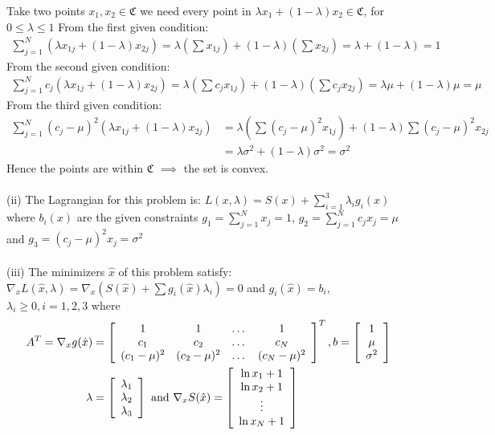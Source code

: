 \documentclass[12pt]{report}
\begin{document}
Take two points $x_1,x_2 \in \mathfrak{C}$ we need every point in $\lambda x_1 + (1-\lambda) x_2 \in \mathfrak{C}$, for 
$0\leq \lambda \leq 1 $
From the first given condition:
\begin{align*}
\sum_{j=1}^{N} \left( \lambda x_{1j} + (1- \lambda) x_{2j} \right) 
= \lambda(\sum x_{1j})+(1-\lambda)(\sum x_{2j}) = \lambda + (1-\lambda) = 1
\end{align*}
From the second given condition:
\begin{align*}
\sum_{j=1}^{N} c_j\left( \lambda x_{1j} + (1- \lambda) x_{2j} \right)
= \lambda(\sum c_j x_{1j} )+(1-\lambda)(\sum c_j x_{2j}) =  \lambda \mu + (1- \lambda) \mu = \mu
\end{align*}
From the third given condition:
\begin{align*}
\sum_{j=1}^{N} ( c_j-\mu )^2 ( \lambda x_{1j} + (1- \lambda) x_{2j} )
&=  \lambda \left( \sum( c_j-\mu )^2 x_{1j} \right) +(1- \lambda) \sum( c_j-\mu )^2x_{2j}\\
&= \lambda \sigma^2 + (1- \lambda) \sigma^2 = \sigma^2
\end{align*}
Hence the points are within $\mathfrak{C}$ $\implies$ the set is convex.\\
\\
(ii) The Lagrangian for this problem is: $L(x,\lambda)= S(x) + \sum_{i=1}^3 \lambda_i g_i(x) $ where $b_i(x)$ are the given
constraints $g_1 = \sum_{j=1}^Nx_j=1$, $g_2 = \sum_{j=1}^Nc_jx_j=\mu$ and $g_3 = (c_j-\mu)^2x_j=\sigma^2$\\
\\
(iii) The minimizers $\hat{x}$ of this problem satisfy:\\
$\nabla_x L(\hat{x},\lambda)=\nabla_x(S(\hat{x})+\sum g_i(\hat{x})\lambda_i)=0 $ and $g_i(\hat{x})=b_i$,
$\lambda_i\geq 0, i=1,2,3$ where 
\begin{align*}
A^T = \nabla_x g(\hat{x}) &= \left[\begin{array}{c c c c}
1 & 1 & \dots &1 \\
c_1 & c_2 & \dots & c_N \\
(c_1-\mu)^2 & (c_2-\mu)^2 & \dots & (c_N-\mu)^2
\end{array}\right]^T,
b= \left[ \begin{array}{c}
1 \\
\mu \\
\sigma^2
\end{array} \right] \\
\lambda &= \left[
\begin{array}{c}
\lambda_1 \\ \lambda_2 \\ \lambda_3 
\end{array}
\right] \text{ and }
\nabla_x S(\hat{x}) = \left[ \begin{array}{c}
\ln x_1 + 1 \\
\ln x_2 + 1 \\
\vdots \\
\ln x_N + 1 \\
\end{array} \right] 
\end{align*}
\end{document}
